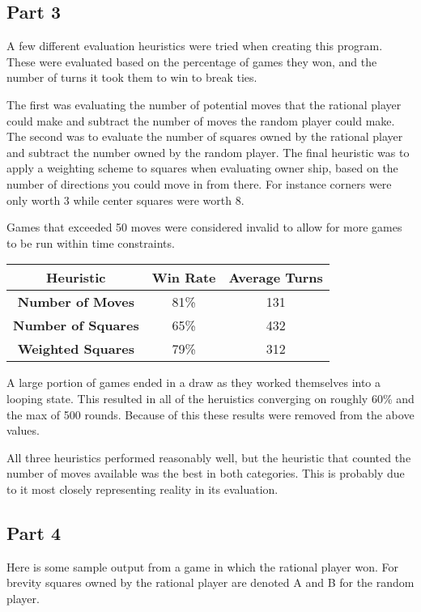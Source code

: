 \documentclass[12pt]{article}
\begin{document}
\subsection*{Part 3}
A few different evaluation heuristics were tried when creating this program. These were evaluated based on the percentage of games they won, and the number of turns it took them to win to break ties.

The first was evaluating the number of potential moves that the rational player could make and subtract the number of moves the random player could make. The second was to evaluate the number of squares owned by the rational player and subtract the number owned by the random player. The final heuristic was to apply a weighting scheme to squares when evaluating owner ship, based on the number of directions you could move in from there. For instance corners were only worth 3 while center squares were worth 8.

Games that exceeded 50 moves were considered invalid to allow for more games to be run within time constraints.

\begin{center}
\begin{tabular}{|c|c|c|}
\hline
\textbf{Heuristic} & \textbf{Win Rate} & \textbf{Average Turns}  \\ \hline
\textbf{Number of Moves} & 81\% & 131  \\ \hline
\textbf{Number of Squares} & 65\% & 432  \\ \hline
\textbf{Weighted Squares} & 79\% & 312  \\ \hline
\end{tabular}
\end{center}

A large portion of games ended in a draw as they worked themselves into a looping state. This resulted in all of the heruistics converging on roughly 60\% and the max of 500 rounds. Because of this these results were removed from the above values.

All three heuristics performed reasonably well, but the heuristic that counted the number of moves available was the best in both categories. This is probably due to it most closely representing reality in its evaluation.

\subsection*{Part 4}
Here is some sample output from a game in which the rational player won. For brevity squares owned by the rational player are denoted A and B for the random player.
\end{document}
